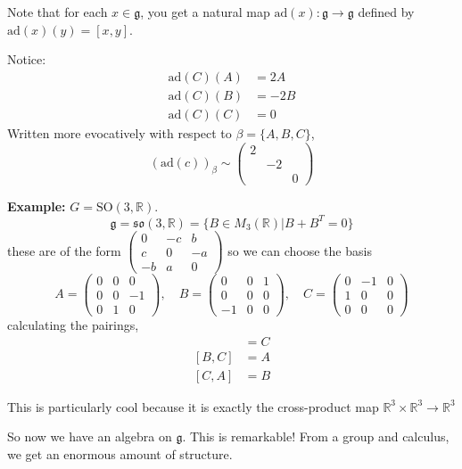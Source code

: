 \documentclass[12pt]{article}
\newcommand{\R}{\mathbb{R}}
\newcommand{\SO}{\text{SO}}
\newcommand{\g}{\mathfrak{g}}
\begin{document}
    Note that for each $x \in \g$, you get a natural map $\text{ad}(x): \g \to \g$ defined by $\text{ad}(x)(y) = [x, y]$. 

    Notice:
    \begin{align*}
        \text{ad}(C)(A) &= 2A\\ 
        \text{ad}(C)(B) &= -2B\\
        \text{ad}(C)(C) &= 0
    \end{align*}
    Written more evocatively with respect to $\beta = \{A, B, C\}$, 
    \[(\text{ad}(c))_{\beta} \sim \begin{pmatrix}
        2\\
        & -2\\ 
        & & 0
    \end{pmatrix}\]

    \textbf{Example:} $G = \SO(3, \R)$. 
    \[\g = \mathfrak{so}(3, \R) = \{B \in M_3(\R) \big\vert B + B^T = 0\}\]
    these are of the form $\begin{pmatrix}
        0 & -c & b\\ 
        c & 0 & -a\\ 
        -b & a & 0
    \end{pmatrix}$ so we can choose the basis 
    \[A = \begin{pmatrix}
        0 & 0 & 0\\ 
        0 & 0 & -1\\ 
        0 & 1 & 0
    \end{pmatrix}, \quad B = \begin{pmatrix}
        0 & 0 & 1\\ 
        0 & 0 & 0\\ 
        -1 & 0 & 0
    \end{pmatrix}, \quad C = \begin{pmatrix}
        0 & -1 & 0\\ 
        1 & 0 & 0\\ 
        0 & 0 & 0
    \end{pmatrix}\]
    calculating the pairings, 
    \begin{align*}
        [A, B] &= C\\ 
        [B, C] &= A\\ 
        [C, A] &= B 
    \end{align*}

    This is particularly cool because it is exactly the cross-product map $\R^3 \times \R^3 \to \R^3$

    So now we have an algebra on $\g$. This is remarkable! From a group and calculus, we get an enormous amount of structure. 
\end{document}
